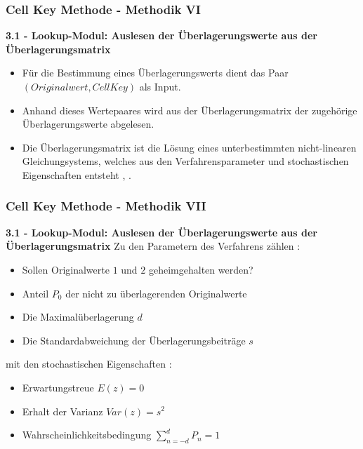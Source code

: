 \documentclass[aspectratio=169]{beamer}
\begin{document}
\begin{frame}{}
	\frametitle{Cell Key Methode - Methodik VI}
    \textbf{3.1 - Lookup-Modul:  Auslesen der Überlagerungswerte aus der Überlagerungsmatrix}
    \begin{itemize}
        \item Für die Bestimmung eines Überlagerungswerts dient das Paar $(Originalwert, CellKey)$ als Input.
        \item Anhand dieses Wertepaares wird aus der Überlagerungsmatrix der zugehörige Überlagerungswerte abgelesen.
        \item Die Überlagerungsmatrix ist die Lösung eines unterbestimmten nicht-linearen Gleichungsystems, welches aus den Verfahrensparameter und stochastischen Eigenschaften entsteht \cite{Höhne}, \cite{Enderle}.
    \end{itemize}
\end{frame}


\begin{frame}{}
	\frametitle{Cell Key Methode - Methodik VII}
    \textbf{3.1 - Lookup-Modul:  Auslesen der Überlagerungswerte aus der Überlagerungsmatrix}
    Zu den Parametern des Verfahrens zählen \cite{Höhne}:
    \begin{itemize}
        \item Sollen Originalwerte $1$ und $2$ geheimgehalten werden?
        \item Anteil $P_0$ der nicht zu überlagerenden Originalwerte
        \item Die Maximalüberlagerung $d$
        \item Die Standardabweichung der Überlagerungsbeiträge $s$
    \end{itemize}
    mit den stochastischen Eigenschaften \cite{Höhne}:
    \begin{itemize}
        \item Erwartungstreue $E(z) = 0$
        \item Erhalt der Varianz $Var(z) = s^2$
        \item Wahrscheinlichkeitsbedingung $\sum_{n=-d}^{d} P_n = 1$
    \end{itemize}
\end{frame}
\end{document}
